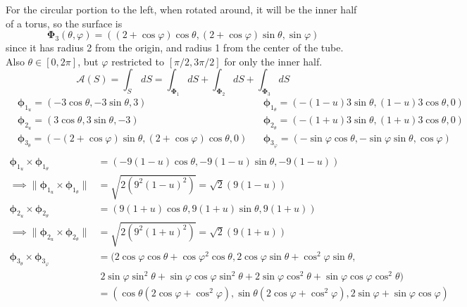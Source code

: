 \documentclass{article}
\newcommand{\norm}[1]{\| #1 \|}
\begin{document}
\begin{enumerate}
    For the circular portion to the left, when rotated around, it will be the inner half of a torus, so the surface is
    \[ \boldsymbol \Phi_3 (\theta, \varphi) = ((2+\cos\varphi)\cos \theta, (2+\cos\varphi)\sin \theta, \sin \varphi)\]
    since it has radius 2 from the origin, and radius 1 from the center of the tube. Also $\theta \in [0,2\pi]$, but $\varphi$ restricted to $[\pi/2, 3\pi/2]$ for only the inner half.
    \[ \mathcal A (S) = \int_S \,dS = \int_{\boldsymbol \Phi_1} dS + \int_{\boldsymbol \Phi_2} dS + \int_{\boldsymbol \Phi_3} dS \]
    \begin{align*}
        &\boldsymbol \phi_{1_u} = (-3 \cos \theta, -3\sin \theta, 3) & &  \boldsymbol \phi_{1_ \theta} = (- (1-u) 3 \sin \theta, (1-u)3\cos\theta, 0) & \\
        & \boldsymbol \phi_{2_u} = (3 \cos \theta, 3\sin \theta, -3)  & & \boldsymbol \phi_{2_ \theta} = (- (1+u) 3 \sin \theta, (1+u)3\cos\theta, 0) & \\
        & \boldsymbol \phi_{3_\theta} = (-(2+\cos \varphi) \sin\theta, (2+\cos \varphi)\cos \theta, 0)  & & \boldsymbol \phi_{3_ \varphi} = (-\sin \varphi \cos \theta, -\sin \varphi \sin \theta, \cos \varphi) & \\
    \end{align*}
    \begin{align*}
        \boldsymbol \phi_{1_u} \times \boldsymbol \phi_{1_ \theta} &=       (-9(1-u)\cos\theta, -9(1-u)\sin\theta, -9(1-u)) \\
        \implies \norm {\boldsymbol \phi_{1_u} \times \boldsymbol \phi_{1_ \theta}} &= \sqrt{2(9^2(1-u)^2)} = \sqrt{2}(9(1-u)) \\
        \boldsymbol \phi_{2_u} \times \boldsymbol \phi_{2_ \theta} &=       (9(1+u)\cos\theta, 9(1+u)\sin\theta, 9(1+u)) \\
        \implies \norm {\boldsymbol \phi_{2_u} \times \boldsymbol \phi_{2_ \theta}} &= \sqrt{2(9^2(1+u)^2)} = \sqrt{2}(9(1+u)) \\
        \boldsymbol \phi_{3_\theta} \times \boldsymbol \phi_{3_ \varphi} &= (2 \cos\varphi \cos\theta + \cos\varphi^2 \cos\theta, 2 \cos \varphi \sin \theta + \cos^2 \varphi \sin \theta, \\
        & \; 2\sin \varphi \sin^2 \theta + \sin \varphi \cos \varphi \sin ^2 \theta + 2 \sin \varphi \cos^2 \theta + \sin\varphi \cos\varphi \cos^2 \theta ) \\
        &= (\cos\theta (2 \cos\varphi + \cos^2\varphi), \sin\theta (2 \cos \varphi + \cos^2 \varphi) , 2\sin \varphi + \sin \varphi \cos \varphi ) \\

\end{align*}
\end{enumerate}
\end{document}
